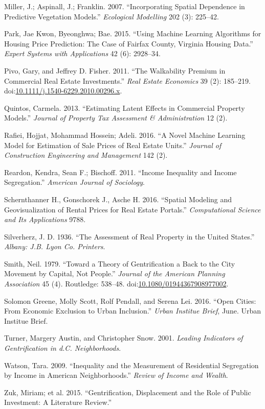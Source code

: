 \documentclass[]{article}
\begin{document}
\hypertarget{ref-Miller2015}{}
Miller, J.; Aspinall, J.; Franklin. 2007. ``Incorporating Spatial
Dependence in Predictive Vegetation Models.'' \emph{Ecological
Modelling} 202 (3): 225--42.

\hypertarget{ref-Park2015}{}
Park, Jae Kwon, Byeonghwa; Bae. 2015. ``Using Machine Learning
Algorithms for Housing Price Prediction: The Case of Fairfax County,
Virginia Housing Data.'' \emph{Expert Systems with Applications} 42 (6):
2928--34.

\hypertarget{ref-Pivo2011}{}
Pivo, Gary, and Jeffrey D. Fisher. 2011. ``The Walkability Premium in
Commercial Real Estate Investments.'' \emph{Real Estate Economics} 39
(2): 185--219.
doi:\href{https://doi.org/10.1111/j.1540-6229.2010.00296.x}{10.1111/j.1540-6229.2010.00296.x}.

\hypertarget{ref-Quintos2013}{}
Quintos, Carmela. 2013. ``Estimating Latent Effects in Commercial
Property Models.'' \emph{Journal of Property Tax Assessment \&
Administration} 12 (2).

\hypertarget{ref-Rafiei2016}{}
Rafiei, Hojjat, Mohammad Hossein; Adeli. 2016. ``A Novel Machine
Learning Model for Estimation of Sale Prices of Real Estate Units.''
\emph{Journal of Construction Engineering and Management} 142 (2).

\hypertarget{ref-Reardon2011}{}
Reardon, Kendra, Sean F.; Bischoff. 2011. ``Income Inequality and Income
Segregation.'' \emph{American Journal of Sociology}.

\hypertarget{ref-Schernthanner2016}{}
Schernthanner H., Gonschorek J., Asche H. 2016. ``Spatial Modeling and
Geovisualization of Rental Prices for Real Estate Portals.''
\emph{Computational Science and Its Applications} 9788.

\hypertarget{ref-Silverherz1936}{}
Silverherz, J. D. 1936. ``The Assessment of Real Property in the United
States.'' \emph{Albany: J.B. Lyon Co. Printers}.

\hypertarget{ref-Smith1979}{}
Smith, Neil. 1979. ``Toward a Theory of Gentrification a Back to the
City Movement by Capital, Not People.'' \emph{Journal of the American
Planning Association} 45 (4). Routledge: 538--48.
doi:\href{https://doi.org/10.1080/01944367908977002}{10.1080/01944367908977002}.

\hypertarget{ref-urban2016}{}
Solomon Greene, Molly Scott, Rolf Pendall, and Serena Lei. 2016. ``Open
Cities: From Economic Exclusion to Urban Inclusion.'' \emph{Urban
Institue Brief}, June. Urban Institue Brief.

\hypertarget{ref-Turner2001}{}
Turner, Margery Austin, and Christopher Snow. 2001. \emph{Leading
Indicators of Gentrification in d.C. Neighborhoods}.

\hypertarget{ref-Watson2009}{}
Watson, Tara. 2009. ``Inequality and the Measurement of Residential
Segregation by Income in American Neighborhoods.'' \emph{Review of
Income and Wealth}.

\hypertarget{ref-Zuk2015}{}
Zuk, Miriam; et al. 2015. ``Gentrification, Displacement and the Role of
Public Investment: A Literature Review.''
\end{document}
